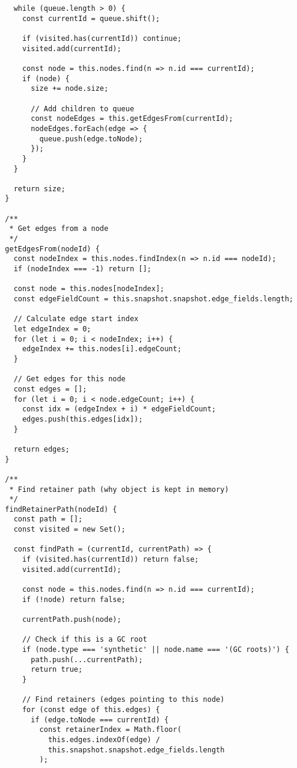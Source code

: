 \documentclass[11pt]{article}
\begin{document}
\begin{verbatim}
    while (queue.length > 0) {
      const currentId = queue.shift();
      
      if (visited.has(currentId)) continue;
      visited.add(currentId);
      
      const node = this.nodes.find(n => n.id === currentId);
      if (node) {
        size += node.size;
        
        // Add children to queue
        const nodeEdges = this.getEdgesFrom(currentId);
        nodeEdges.forEach(edge => {
          queue.push(edge.toNode);
        });
      }
    }
    
    return size;
  }
  
  /**
   * Get edges from a node
   */
  getEdgesFrom(nodeId) {
    const nodeIndex = this.nodes.findIndex(n => n.id === nodeId);
    if (nodeIndex === -1) return [];
    
    const node = this.nodes[nodeIndex];
    const edgeFieldCount = this.snapshot.snapshot.edge_fields.length;
    
    // Calculate edge start index
    let edgeIndex = 0;
    for (let i = 0; i < nodeIndex; i++) {
      edgeIndex += this.nodes[i].edgeCount;
    }
    
    // Get edges for this node
    const edges = [];
    for (let i = 0; i < node.edgeCount; i++) {
      const idx = (edgeIndex + i) * edgeFieldCount;
      edges.push(this.edges[idx]);
    }
    
    return edges;
  }
  
  /**
   * Find retainer path (why object is kept in memory)
   */
  findRetainerPath(nodeId) {
    const path = [];
    const visited = new Set();
    
    const findPath = (currentId, currentPath) => {
      if (visited.has(currentId)) return false;
      visited.add(currentId);
      
      const node = this.nodes.find(n => n.id === currentId);
      if (!node) return false;
      
      currentPath.push(node);
      
      // Check if this is a GC root
      if (node.type === 'synthetic' || node.name === '(GC roots)') {
        path.push(...currentPath);
        return true;
      }
      
      // Find retainers (edges pointing to this node)
      for (const edge of this.edges) {
        if (edge.toNode === currentId) {
          const retainerIndex = Math.floor(
            this.edges.indexOf(edge) / 
            this.snapshot.snapshot.edge_fields.length
          );
          

\end{verbatim}
\end{document}
